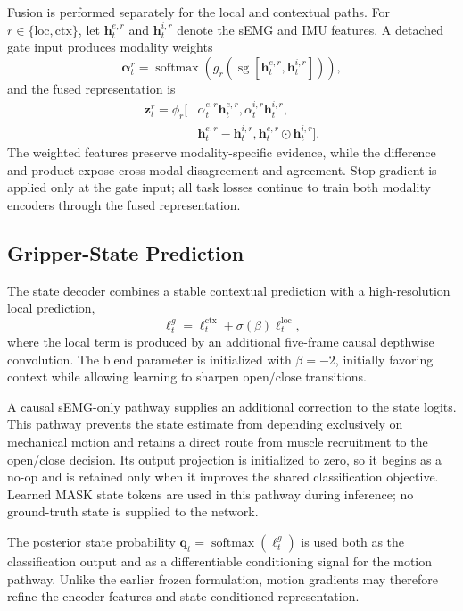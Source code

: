 Fusion is performed separately for the local and contextual paths. For
$r\in\{\mathrm{loc},\mathrm{ctx}\}$, let $\mathbf h_t^{e,r}$ and
$\mathbf h_t^{i,r}$ denote the sEMG and IMU features. A detached gate input
produces modality weights
\begin{equation}
 \boldsymbol{\alpha}_t^r=
 \operatorname{softmax}\!\left(
 g_r\!\left(\operatorname{sg}
 [\mathbf h_t^{e,r},\mathbf h_t^{i,r}]\right)\right),
\end{equation}
and the fused representation is
\begin{align}
 \mathbf z_t^r=\phi_r\big[&
 \alpha_t^{e,r}\mathbf h_t^{e,r},
 \alpha_t^{i,r}\mathbf h_t^{i,r},\nonumber\\
 &\mathbf h_t^{e,r}-\mathbf h_t^{i,r},
 \mathbf h_t^{e,r}\odot\mathbf h_t^{i,r}\big].
\end{align}
The weighted features preserve modality-specific evidence, while the difference
and product expose cross-modal disagreement and agreement. Stop-gradient is
applied only at the gate input; all task losses continue to train both modality
encoders through the fused representation.

\subsection{Gripper-State Prediction}
\label{subsec:state}

The state decoder combines a stable contextual prediction with a
high-resolution local prediction,
\begin{equation}
    \boldsymbol{\ell}_t^g=
    \boldsymbol{\ell}_t^{\mathrm{ctx}}
    +\sigma(\beta)\boldsymbol{\ell}_t^{\mathrm{loc}},
\end{equation}
where the local term is produced by an additional five-frame causal depthwise
convolution. The blend parameter is initialized with $\beta=-2$, initially
favoring context while allowing learning to sharpen open/close transitions.

A causal sEMG-only pathway supplies an additional correction to the state
logits. This pathway prevents the state estimate from depending exclusively on
mechanical motion and retains a direct route from muscle recruitment to the
open/close decision. Its output projection is initialized to zero, so it begins
as a no-op and is retained only when it improves the shared classification
objective. Learned MASK state tokens are used in this pathway during inference;
no ground-truth state is supplied to the network.

The posterior state probability
$\mathbf q_t=\operatorname{softmax}(\boldsymbol{\ell}_t^g)$ is used both as the
classification output and as a differentiable conditioning signal for the
motion pathway. Unlike the earlier frozen formulation, motion gradients may
therefore refine the encoder features and state-conditioned representation.

